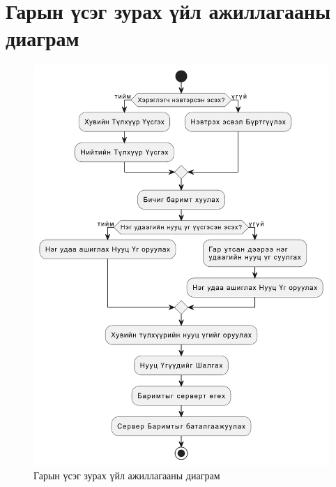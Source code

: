 \section[Үйл ажиллагааны диаграм]{Гарын үсэг зурах үйл ажиллагааны диаграм}
\begin{figure}[h!]
	\centering
	\includegraphics[scale=0.36]{assets/activity.png}
	\caption{Гарын үсэг зурах үйл ажиллагааны диаграм}
	\label{fig:activity}
\end{figure}